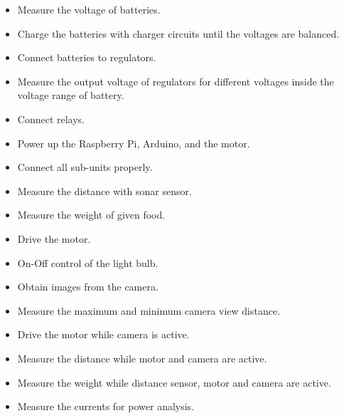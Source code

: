\begin{itemize}
\item Measure the voltage of batteries.
\item Charge the batteries with charger circuits until the voltages are balanced.
\item Connect batteries to regulators.
\item Measure the output voltage of regulators for different voltages inside the voltage range of battery.
\item Connect relays.
\item Power up the Raspberry Pi, Arduino, and the motor.
\item Connect all sub-units properly.
\item Measure the distance with sonar sensor.
\item Measure the weight of given food.
\item Drive the motor.
\item On-Off control of the light bulb.
\item Obtain images from the camera.
\item Measure the maximum and minimum camera view distance.
\item Drive the motor while camera is active.
\item Measure the distance while motor and camera are active.
\item Measure the weight while distance sensor, motor and camera are active.
\item Measure the currents for power analysis.
\end{itemize}


